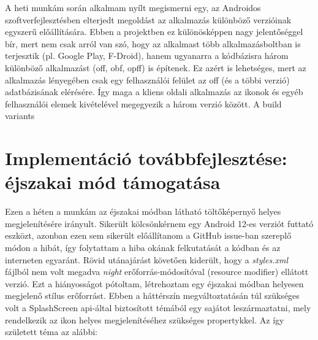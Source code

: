 A heti munkám során alkalmam nyílt megismerni egy, az Androidos szoftverfejlesztésben elterjedt
megoldást az alkalmazás különböző verzióinak egyszerű előállítására. Ebben a projektben ez
különösképpen nagy jelentőséggel bír, mert nem csak arról van szó, hogy az alkalmast több
alkalmazásboltban is terjesztik (pl. Google Play, F-Droid), hanem ugyanarra a kódbázisra
három különböző alkalmazást (\acrfull{off}, \acrfull{obf}, \acrfull{opff})
is építenek. Ez azért is lehetséges, mert az alkalmazás lényegében csak egy felhasználói felület
az \acrlong{off} (és a többi verzió) adatbázisának elérésére. Így maga a kliens oldali alkalmazás
az ikonok és egyéb felhasználói elemek kivételével megegyezik a három verzió között.
A build variants %


\section{Implementáció továbbfejlesztése: éjszakai mód támogatása}
Ezen a héten a munkám az éjszakai módban látható töltőképernyő helyes megjelenítésére irányult.
Sikerült kölcsönkérnem egy Android 12-es verziót futtató eszközt, azonban ezen sem sikerült
előállítanom a GitHub issue-ban szereplő módon a hibát, így folytattam a hiba okának felkutatását
a kódban és az interneten egyaránt. Rövid utánajárást követően kiderült, hogy a
\textit{styles.xml} fájlból nem volt megadva \textit{night} erőforrás-módosítóval
(resource modifier) ellátott verzió. Ezt a hiányosságot pótoltam, létrehoztam egy éjszakai
módban helyesen megjelenő stílus erőforrást. Ebben a háttérszín megváltoztatásán túl szükséges
volt a SplashScreen \acrshort{api}-által biztosított témából egy sajátot leszármaztatni, mely rendelkezik
az ikon helyes megjelenítéséhez szükséges propertykkel. Az így született téma az alábbi:

